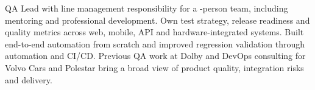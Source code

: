 QA Lead with line management responsibility for a \qaTeamSize-person team,
including mentoring and professional development. Own test strategy, release
readiness and quality metrics across web, mobile, API and hardware-integrated
systems. Built end-to-end automation from scratch and
improved regression validation through automation and CI/CD. Previous QA work at
Dolby and DevOps consulting for Volvo Cars and Polestar bring a broad view of
product quality, integration risks and delivery.
